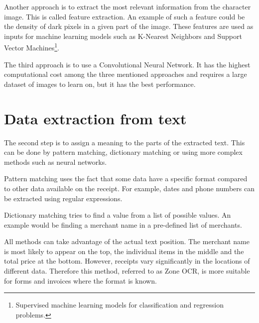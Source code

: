 \documentclass[
  printed, %
  table,   %
  oneside, %
  lof,     %
  lot,     %
]{fithesis3}
\begin{document}
Another approach is to extract the most relevant information from the character image. This is called feature extraction. An example of such a feature could be the density of dark pixels in a given part of the image. These features are used as inputs for machine learning models such as K-Nearest Neighbors and Support Vector Machines\footnote{Supervised machine learning models for classification and regression problems.}. \cite{Singh2011Feature}

The third approach is to use a Convolutional
Neural Network. It has the highest computational cost among the three mentioned approaches and requires a large dataset of images to learn on, but it has the best performance. \cite{Shreya2019OCRCNN}

\section{Data extraction from text}
The second step is to assign a meaning to the parts of the extracted text. This can be done by pattern matching, dictionary matching or using more complex methods such as neural networks. 

Pattern matching uses the fact that some data have a specific format compared to other data available on the receipt. For example, dates and phone numbers can be extracted using regular expressions.

Dictionary matching tries to find a value from a list of possible values. An example would be finding a merchant name in a pre-defined list of merchants.

All methods can take advantage of the actual text position. The merchant name is most likely to appear on the top, the individual items in the middle and the total price at the bottom. However, receipts vary significantly in the locations of different data. Therefore this method, referred to as Zone OCR, is more suitable for forms and invoices where the format is known.
\end{document}
